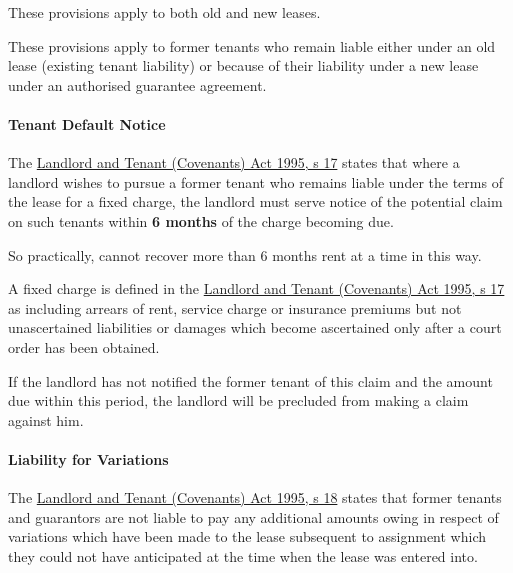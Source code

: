 \documentclass[
]{article}
\newenvironment{Shaded}{}{}
\newcommand{\NormalTok}[1]{#1}
\begin{document}
These provisions apply to both old and new leases.

These provisions apply to former tenants who remain liable either under
an old lease (existing tenant liability) or because of their liability
under a new lease under an authorised guarantee agreement.

\hypertarget{tenant-default-notice}{%
\paragraph{Tenant Default Notice}\label{tenant-default-notice}}

The
\href{https://www.legislation.gov.uk/ukpga/1995/30/section/17}{Landlord
and Tenant (Covenants) Act 1995, s 17} states that where a landlord
wishes to pursue a former tenant who remains liable under the terms of
the lease for a fixed charge, the landlord must serve notice of the
potential claim on such tenants within \textbf{6 months} of the charge
becoming due.

\begin{Shaded}
\begin{Highlighting}[]
\NormalTok{So practically, cannot recover more than 6 months rent at a time in this way. }
\end{Highlighting}
\end{Shaded}

A fixed charge is defined in the
\href{https://www.legislation.gov.uk/ukpga/1995/30/section/17}{Landlord
and Tenant (Covenants) Act 1995, s 17} as including arrears of rent,
service charge or insurance premiums but not unascertained liabilities
or damages which become ascertained only after a court order has been
obtained.

If the landlord has not notified the former tenant of this claim and the
amount due within this period, the landlord will be precluded from
making a claim against him.

\hypertarget{liability-for-variations}{%
\paragraph{Liability for Variations}\label{liability-for-variations}}

The
\href{https://www.legislation.gov.uk/ukpga/1995/30/section/18}{Landlord
and Tenant (Covenants) Act 1995, s 18} states that former tenants and
guarantors are not liable to pay any additional amounts owing in respect
of variations which have been made to the lease subsequent to assignment
which they could not have anticipated at the time when the lease was
entered into.
\end{document}
